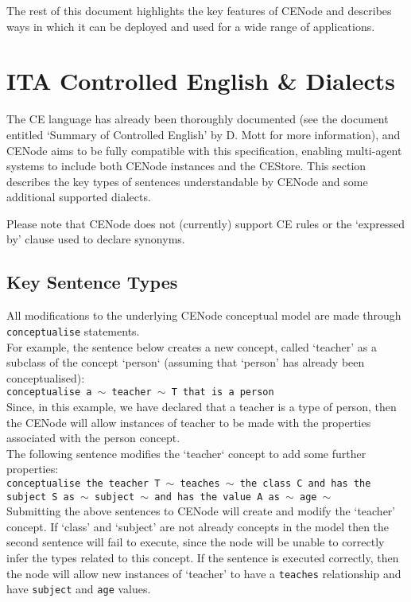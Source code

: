 \documentclass{scrartcl}
\begin{document}
The rest of this document highlights the key features of CENode and describes ways in which it can be deployed and used for a wide range of applications.

\section{ITA Controlled English \& Dialects}
The CE language has already been thoroughly documented (see the document entitled `Summary of Controlled English' by D. Mott for more information), and CENode aims to be fully compatible with this specification, enabling multi-agent systems to include both CENode instances and the CEStore. This section describes the key types of sentences understandable by CENode and some additional supported dialects.

Please note that CENode does not (currently) support CE rules or the `expressed by' clause used to declare synonyms.

\subsection{Key Sentence Types}
All modifications to the underlying CENode conceptual model are made through \texttt{conceptualise} statements.\\

For example, the sentence below creates a new concept, called `teacher' as a subclass of the concept `person` (assuming that `person' has already been conceptualised):\\
\texttt{conceptualise a $\sim$ teacher $\sim$ T that is a person}\\

Since, in this example, we have declared that a teacher is a type of person, then the CENode will allow instances of teacher to be made with the properties associated with the person concept.\\ 

The following sentence modifies the `teacher` concept to add some further properties:\\
\texttt{conceptualise the teacher T $\sim$ teaches $\sim$ the class C and has the subject S as $\sim$ subject $\sim$ and has the value A as $\sim$ age $\sim$}\\

Submitting the above sentences to CENode will create and modify the `teacher' concept. If `class' and `subject' are not already concepts in the model then the second sentence will fail to execute, since the node will be unable to correctly infer the types related to this concept. If the sentence is executed correctly, then the node will allow new instances of `teacher' to have a \texttt{teaches} relationship and have \texttt{subject} and \texttt{age} values.\\
\end{document}
